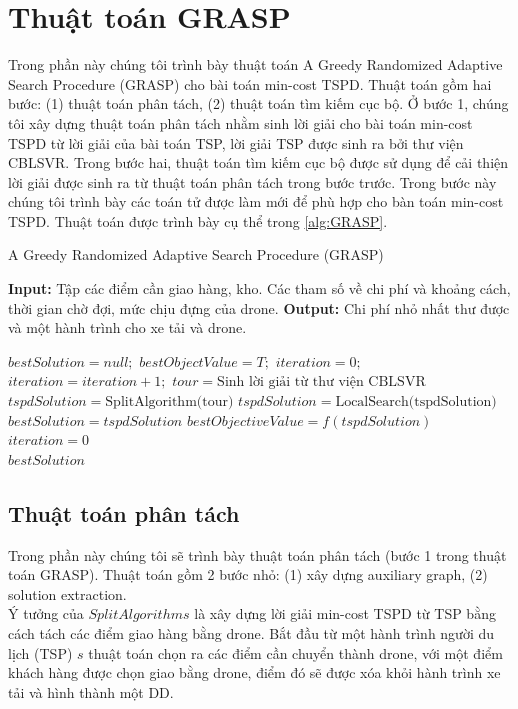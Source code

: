 \documentclass[a4paper,12pt]{report}
\begin{document}
\section{Thuật toán GRASP}
\label{section:grasp}
Trong phần này chúng tôi trình bày thuật toán A Greedy Randomized Adaptive Search Procedure (GRASP) cho bài toán min-cost TSPD. Thuật toán gồm hai bước: (1) thuật toán phân tách, (2) thuật toán tìm kiếm cục bộ. Ở bước 1, chúng tôi xây dựng thuật toán phân tách nhằm sinh lời giải cho bài toán min-cost TSPD từ lời giải của bài toán TSP, lời giải TSP được sinh ra bởi thư viện CBLSVR. Trong bước hai, thuật toán tìm kiếm cục bộ được sử dụng để cải thiện lời giải được sinh ra từ thuật toán phân tách trong bước trước. Trong bước này chúng tôi trình bày các toán tử được làm mới để phù hợp cho bàn toán min-cost TSPD. Thuật toán được trình bày cụ thể trong \ref{alg:GRASP}.
\begin{algorithm}[H]
\caption{A Greedy Randomized Adaptive Search Procedure (GRASP)}
\textbf{Input:} Tập các điểm cần giao hàng, kho. Các tham số về chi phí và khoảng cách, thời gian chờ đợi, mức chịu đựng của drone.
\textbf{Output:} Chi phí nhỏ nhất thư được và một hành trình cho xe tải và drone.
\begin{algorithmic}[1]
\State $bestSolution=null;$
\State $bestObjectValue=T;$
\State $iteration=0;$
\State $iteration=iteration+1;$
\State $tour=\text{Sinh lời giải từ thư viện CBLSVR}$
\State $tspdSolution=\text{SplitAlgorithm(tour)}$
\State $tspdSolution=\text{LocalSearch(tspdSolution)}$
\State $bestSolution=tspdSolution$
\State $bestObjectiveValue=f(tspdSolution)$
\State $iteration=0$
\EndIf
\EndWhile\\
\Return $bestSolution$
\end{algorithmic}
\label{alg:GRASP}
\end{algorithm}
\subsection{Thuật toán phân tách}
Trong phần này chúng tôi sẽ trình bày thuật toán phân tách (bước 1 trong thuật toán GRASP). Thuật toán gồm 2 bước nhỏ: (1) xây dựng auxiliary graph, (2) solution extraction. \\

Ý tưởng của $SplitAlgorithms$ là xây dựng lời giải min-cost TSPD từ TSP bằng cách tách các điểm giao hàng bằng drone. Bắt đầu từ một hành trình người du lịch (TSP) $s$ thuật toán chọn ra các điểm cần chuyển thành drone, với một điểm khách hàng được chọn giao bằng drone, điểm đó sẽ được xóa khỏi hành trình xe tải và hình thành một DD.
\end{document}
